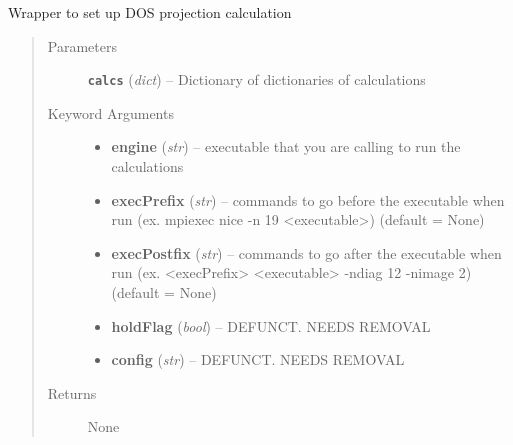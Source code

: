 \documentclass[letterpaper,10pt,english]{sphinxmanual}
\begin{document}
\begin{fulllineitems}
\label{run:run.pdos}
Wrapper to set up DOS projection calculation
\begin{quote}\begin{description}
\item[{Parameters}] \leavevmode
\textbf{\texttt{calcs}} (\emph{dict}) -- Dictionary of dictionaries of calculations

\item[{Keyword Arguments}] \leavevmode\begin{itemize}
\item {} 
\textbf{engine} (\emph{str}) --
executable that you are calling to run the calculations

\item {} 
\textbf{execPrefix} (\emph{str}) --
commands to go before the executable when run
(ex. mpiexec nice -n 19 \textless{}executable\textgreater{}) (default = None)

\item {} 
\textbf{execPostfix} (\emph{str}) --
commands to go after the executable when run
(ex. \textless{}execPrefix\textgreater{} \textless{}executable\textgreater{} -ndiag 12 -nimage 2) (default = None)

\item {} 
\textbf{holdFlag} (\emph{bool}) --
DEFUNCT. NEEDS REMOVAL

\item {} 
\textbf{config} (\emph{str}) --
DEFUNCT. NEEDS REMOVAL

\end{itemize}

\item[{Returns}] \leavevmode
None

\end{description}\end{quote}

\end{fulllineitems}

\end{document}
